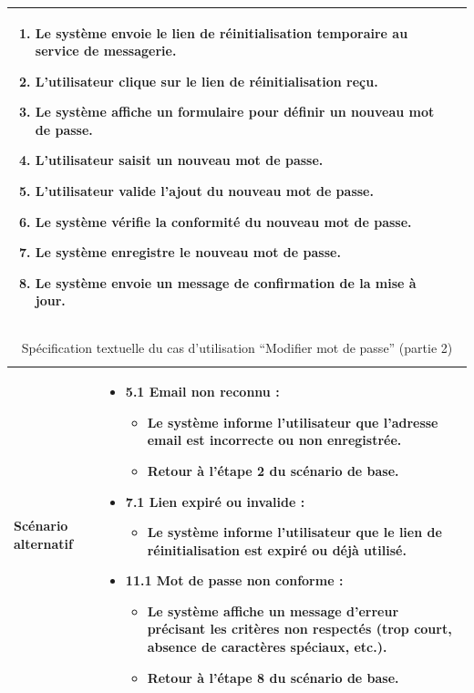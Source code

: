\documentclass[a4paper,11pt]{report}
\begin{document}
\begin{table}[H]
\begin{tabularx}{\textwidth}{|l|X|}
\begin{enumerate}[leftmargin=*]
        \item Le système envoie le lien de réinitialisation temporaire au service de messagerie.
        \item L’utilisateur clique sur le lien de réinitialisation reçu.
        \item Le système affiche un formulaire pour définir un nouveau mot de passe.
        \item L’utilisateur saisit un nouveau mot de passe.
        \item L’utilisateur valide l’ajout du nouveau mot de passe.
        \item Le système vérifie la conformité du nouveau mot de passe.
        \item Le système enregistre le nouveau mot de passe.
        \item Le système envoie un message de confirmation de la mise à jour.
      \end{enumerate} \\ \hline
  \end{tabularx}
\end{table}

\newpage
\begin{table}[H]
  \centering
  \renewcommand{\arraystretch}{1.5}
  \caption{Spécification textuelle du cas d'utilisation “Modifier mot de passe” (partie 2)}
  \begin{tabularx}{\textwidth}{|l|X|}
    \hline
    \textbf{Scénario alternatif} & 
      \begin{itemize}[leftmargin=*]
        \item \textbf{5.1 Email non reconnu :}
          \begin{itemize}[leftmargin=1em]
            \item Le système informe l’utilisateur que l’adresse email est incorrecte ou non enregistrée.
            \item Retour à l’étape 2 du scénario de base.
          \end{itemize}
        \item \textbf{7.1 Lien expiré ou invalide :}
          \begin{itemize}[leftmargin=1em]
            \item Le système informe l’utilisateur que le lien de réinitialisation est expiré ou déjà utilisé.
          \end{itemize}
        \item \textbf{11.1 Mot de passe non conforme :}
          \begin{itemize}[leftmargin=1em]
            \item Le système affiche un message d’erreur précisant les critères non respectés (trop court, absence de caractères spéciaux, etc.).
            \item Retour à l’étape 8 du scénario de base.
          \end{itemize}
      \end{itemize} \\ \hline
  \end{tabularx}
\end{table}
\end{document}

